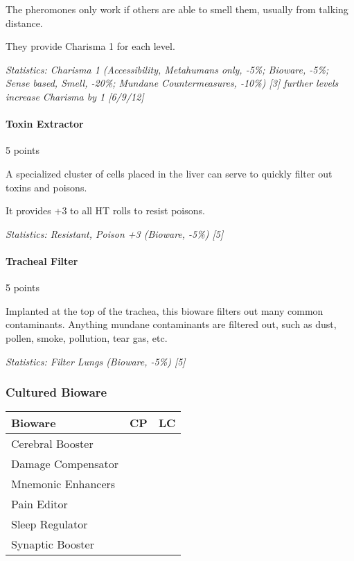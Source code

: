 \begin{multicols*}{3}
	The pheromones only work if others are able to smell them, usually from talking distance. 
	
	They provide Charisma 1 for each level.
	
	\textit{\textcolor{OliveGreen}{Statistics: Charisma 1 (Accessibility, Metahumans only, -5\%; Bioware, -5\%; Sense based, Smell, -20\%; Mundane Countermeasures, -10\%) [3] further levels increase Charisma by 1 [6/9/12]}}
	
	\paragraph{Toxin Extractor}
	\begin{flushright}
		5 points
	\end{flushright}
	
	A specialized cluster of cells placed in the liver can serve to quickly filter out toxins and poisons.
	
	It provides +3 to all HT rolls to resist poisons.
	
	\textit{\textcolor{OliveGreen}{Statistics: Resistant, Poison +3 (Bioware, -5\%) [5]}}
	
	\paragraph{Tracheal Filter}
	\begin{flushright}
		5 points
	\end{flushright}
	
	Implanted at the top of the trachea, this bioware filters out many common contaminants. Anything mundane contaminants are filtered out, such as dust, pollen, smoke, pollution, tear gas, etc.
	
	\textit{\textcolor{OliveGreen}{Statistics: Filter Lungs (Bioware, -5\%) [5]}}
	
	\subsubsection{Cultured Bioware}
	
	\begin{center}
		\begin{tabularx}{0.32\textwidth}{|X|c|c|}
			\hline
			Bioware & CP & LC\\
			\hline
			\hline
			Cerebral Booster & & \\
			Damage Compensator & & \\
			Mnemonic Enhancers & & \\
			Pain Editor & & \\
			Sleep Regulator & & \\
			Synaptic Booster & & \\
			\hline
		\end{tabularx}
	\end{center}
	

\end{multicols*}
